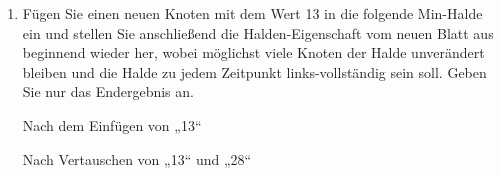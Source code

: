 \documentclass{lehramt-informatik-aufgabe}
\begin{document}
\begin{enumerate}
\begin{liAntwort}
\begin{minipage}{0.5\linewidth}
\end{minipage}
\begin{minipage}{0.5\linewidth}
\end{minipage}
\end{liAntwort}


\item Fügen Sie einen neuen Knoten mit dem Wert 13 in die folgende
Min-Halde ein und stellen Sie anschließend die Halden-Eigenschaft vom
neuen Blatt aus beginnend wieder her, wobei möglichst viele Knoten der
Halde unverändert bleiben und die Halde zu jedem Zeitpunkt
links-vollständig sein soll. Geben Sie nur das Endergebnis an.

\begin{center}
\end{center}

\begin{liDiagramm}{Nach dem Einfügen von „13“}

\end{liDiagramm}

\begin{liDiagramm}{Nach Vertauschen von „13“ und „28“}


\end{liDiagramm}
\end{enumerate}
\end{document}
